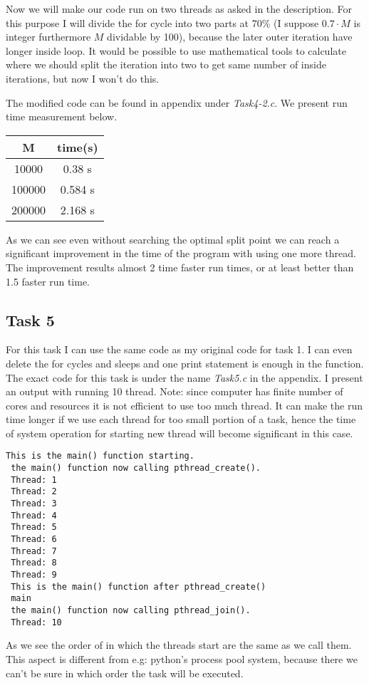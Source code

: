 Now we will make our code run on two threads as asked in the description. For this purpose I will divide the for cycle into two parts at 70\% (I suppose $0.7\cdot M$ is integer furthermore $M$ dividable by 100), because the later outer iteration have longer inside loop. It would be possible to use mathematical tools to calculate where we should split the iteration into two to get same number of inside iterations, but now I won't do this. 

The modified code can be found in appendix under \textit{Task4-2.c}. We present run time measurement below.

\begin{tabular}{c | c}
M & time(s)\\ \hline
10000& 0.38 s\\
100000 & 0.584 s\\
200000 & 2.168 s
\end{tabular}

As we can see even without searching the optimal split point we can reach a significant improvement in the time of the program with using one more thread. The improvement results almost 2 time faster run times, or at least better than 1.5 faster run time. 

\subsection*{Task 5}
For this task I can use the same code as my original code for task 1. I can even delete the for cycles and sleeps and one print statement is enough in the function. The exact code for this task is under the name \textit{Task5.c} in the appendix. I present an output with running 10 thread. Note: since computer has finite number of cores and resources it is not efficient to use too much thread. It can make the run time longer if we use each thread for too small portion of a task, hence the time of system operation for starting new thread will become significant in this case.

\begin{lstlisting}[basicstyle=\ttfamily,frame=single]
 This is the main() function starting.
 the main() function now calling pthread_create().
 Thread: 1
 Thread: 2
 Thread: 3
 Thread: 4
 Thread: 5
 Thread: 6
 Thread: 7
 Thread: 8
 Thread: 9
 This is the main() function after pthread_create()
 main
 the main() function now calling pthread_join().
 Thread: 10
\end{lstlisting}

As we see the order of in which the threads start are the same as we call them. This aspect is different from e.g: python's process pool system, because there we can't be sure in which order the task will be executed. 

